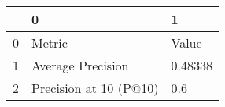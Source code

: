 \begin{tabular}{lll}
\toprule
{} &                       0 &        1 \\
\midrule
0 &                  Metric &    Value \\
1 &       Average Precision &  0.48338 \\
2 &  Precision at 10 (P@10) &      0.6 \\
\bottomrule
\end{tabular}

